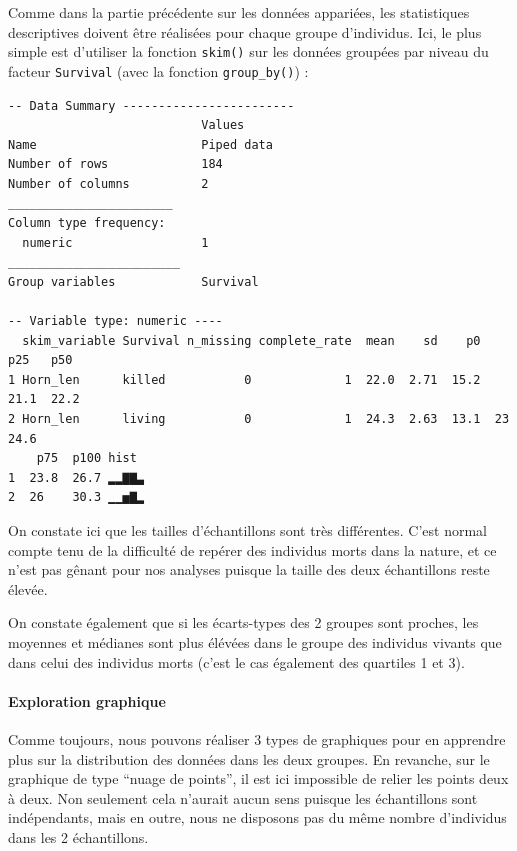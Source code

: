 \documentclass[a4paperpaper,]{article}
\newenvironment{Shaded}{\begin{snugshade}}{\end{snugshade}}
\newcommand{\KeywordTok}[1]{\textcolor[rgb]{0.12,0.11,0.11}{\textbf{#1}}}
\newcommand{\NormalTok}[1]{\textcolor[rgb]{0.12,0.11,0.11}{#1}}
\newcommand{\OperatorTok}[1]{\textcolor[rgb]{0.12,0.11,0.11}{#1}}
\newcommand{\StringTok}[1]{\textcolor[rgb]{0.75,0.01,0.01}{#1}}
\let\oldparagraph\paragraph
\renewcommand{\paragraph}[1]{\oldparagraph{#1}\mbox{}}
\begin{document}
Comme dans la partie précédente sur les données appariées, les statistiques descriptives doivent être réalisées pour chaque groupe d'individus. Ici, le plus simple est d'utiliser la fonction \texttt{skim()} sur les données groupées par niveau du facteur \texttt{Survival} (avec la fonction \texttt{group\_by()}) :

\begin{Shaded}
\end{Shaded}

\begin{verbatim}
-- Data Summary ------------------------
                           Values    
Name                       Piped data
Number of rows             184       
Number of columns          2         
_______________________              
Column type frequency:               
  numeric                  1         
________________________             
Group variables            Survival  

-- Variable type: numeric ----
  skim_variable Survival n_missing complete_rate  mean    sd    p0   p25   p50
1 Horn_len      killed           0             1  22.0  2.71  15.2  21.1  22.2
2 Horn_len      living           0             1  24.3  2.63  13.1  23    24.6
    p75  p100 hist 
1  23.8  26.7 ▂▂▇▇▃
2  26    30.3 ▁▁▅▇▂
\end{verbatim}

On constate ici que les tailles d'échantillons sont très différentes. C'est normal compte tenu de la difficulté de repérer des individus morts dans la nature, et ce n'est pas gênant pour nos analyses puisque la taille des deux échantillons reste élevée.

On constate également que si les écarts-types des 2 groupes sont proches, les moyennes et médianes sont plus élévées dans le groupe des individus vivants que dans celui des individus morts (c'est le cas également des quartiles 1 et 3).

\hypertarget{exploration-graphique-2}{%
\paragraph{Exploration graphique}\label{exploration-graphique-2}}

Comme toujours, nous pouvons réaliser 3 types de graphiques pour en apprendre plus sur la distribution des données dans les deux groupes. En revanche, sur le graphique de type ``nuage de points'', il est ici impossible de relier les points deux à deux. Non seulement cela n'aurait aucun sens puisque les échantillons sont indépendants, mais en outre, nous ne disposons pas du même nombre d'individus dans les 2 échantillons.
\end{document}
